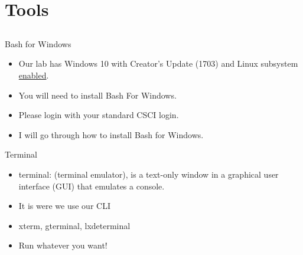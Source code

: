\documentclass{beamer}
\begin{document}

\section{Tools}
\subsection{}

\begin{frame}{Bash for Windows}
\begin{itemize}
\item Our lab has Windows 10 with Creator's Update (1703) and Linux subsystem \underline{enabled}.
\item You will need to install Bash For Windows.
\item Please login with your standard CSCI login.
\item I will go through how to install Bash for Windows.
\end{itemize}
\end{frame}

\begin{frame}{Terminal}
\begin{itemize}
\item terminal: (terminal emulator), is a text-only window in a graphical user interface (GUI) that emulates a console. 
\item It is were we use our CLI
\item xterm, gterminal, lxdeterminal
\item Run whatever you want!
\end{itemize}
\end{frame}
\end{document}
